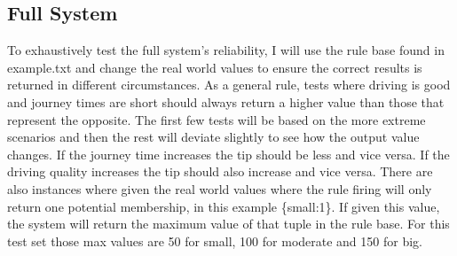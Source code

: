 \documentclass{article}
\begin{document}
\subsection{Full System}
To exhaustively test the full system’s reliability, I will use the rule base found in example.txt and change the real world values to ensure the correct results is returned in different circumstances. As a general rule, tests where driving is good and journey times are short should always return a higher value than those that represent the opposite. The first few tests will be based on the more extreme scenarios and then the rest will deviate slightly to see how the output value changes. If the journey time increases the tip should be less and vice versa. If the driving quality increases the tip should also increase and vice versa. There are also instances where given the real world values where the rule firing will only return one potential membership, in this example \{small:1\}. If given this value, the system will return the maximum value of that tuple in the rule base. For this test set those max values are 50 for small, 100 for moderate and 150 for big.
\end{document}
